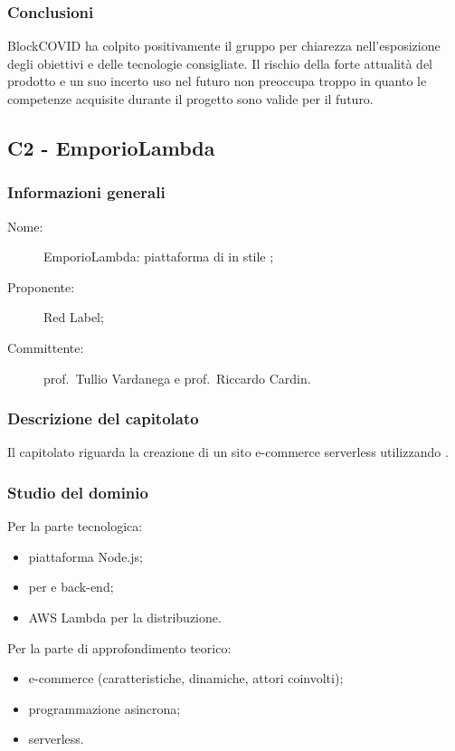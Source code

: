 \subsubsection{Conclusioni}
BlockCOVID ha colpito positivamente il gruppo per chiarezza nell'esposizione degli obiettivi e delle tecnologie consigliate. Il rischio della forte attualità del prodotto e un suo incerto uso nel futuro non preoccupa troppo in quanto le competenze acquisite durante il progetto sono valide per il futuro.

\subsection{C2 - EmporioLambda}
\subsubsection{Informazioni generali}
\begin{description}
	\item[Nome:] EmporioLambda: piattaforma di  in stile ;
	\item[Proponente:] Red Label;
	\item[Committente:] prof.~Tullio Vardanega e prof.~Riccardo Cardin.
\end{description}
\subsubsection{Descrizione del capitolato}
Il capitolato riguarda la creazione di un sito e-commerce serverless utilizzando .
\subsubsection{Studio del dominio}
Per la parte tecnologica:
\begin{itemize}
	\item piattaforma Node.js;
	\item {} per  e back-end;
	\item AWS Lambda per la distribuzione.
\end{itemize}
Per la parte di approfondimento teorico:
\begin{itemize}
	\item e-commerce (caratteristiche, dinamiche, attori coinvolti);
	\item programmazione asincrona;
	\item {} serverless.
\end{itemize}
